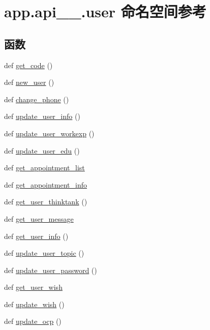 \hypertarget{namespaceapp_1_1api__1__0_1_1user}{}\section{app.\+api\+\_\+\_.\+user 命名空间参考}
\label{namespaceapp_1_1api__1__0_1_1user}
\subsection*{函数}
\begin{DoxyCompactItemize}
\item 
def \hyperlink{namespaceapp_1_1api__1__0_1_1user_aaa1dafab3a77326e0392cf339082e647}{get\+\_\+code} ()
\item 
def \hyperlink{namespaceapp_1_1api__1__0_1_1user_a55691ec00cfa22b8722440ac1c0e5488}{new\+\_\+user} ()
\item 
def \hyperlink{namespaceapp_1_1api__1__0_1_1user_a3decbd5fa1b9c12c3c07f4fd24c9334d}{change\+\_\+phone} ()
\item 
def \hyperlink{namespaceapp_1_1api__1__0_1_1user_a112fe5de3606f23f630ad74b003c3793}{update\+\_\+user\+\_\+info} ()
\item 
def \hyperlink{namespaceapp_1_1api__1__0_1_1user_a0bfdfa2ffc75a64ccceb916fecf3ca4e}{update\+\_\+user\+\_\+workexp} ()
\item 
def \hyperlink{namespaceapp_1_1api__1__0_1_1user_a8717211160238bc1ebc8017125817a3b}{update\+\_\+user\+\_\+edu} ()
\item 
def \hyperlink{namespaceapp_1_1api__1__0_1_1user_ac5e8e848c1b276331fd4973c7cceebc0}{get\+\_\+appointment\+\_\+list}
\item 
def \hyperlink{namespaceapp_1_1api__1__0_1_1user_a612d69aae95b49b644832971825b8c0b}{get\+\_\+appointment\+\_\+info}
\item 
def \hyperlink{namespaceapp_1_1api__1__0_1_1user_a7c088bb5f7150ff7ea87f1ddea02ba5e}{get\+\_\+user\+\_\+thinktank} ()
\item 
def \hyperlink{namespaceapp_1_1api__1__0_1_1user_a5024fd93f333168232806a99ad6cbbd4}{get\+\_\+user\+\_\+message}
\item 
def \hyperlink{namespaceapp_1_1api__1__0_1_1user_aa9a18cd0a720a6b498b2bd35be03ea4e}{get\+\_\+user\+\_\+info} ()
\item 
def \hyperlink{namespaceapp_1_1api__1__0_1_1user_aba3f803f01094c46bab3a2537f5a0e1b}{update\+\_\+user\+\_\+topic} ()
\item 
def \hyperlink{namespaceapp_1_1api__1__0_1_1user_aeb3490c84ceb14d756200260e7c8b2fd}{update\+\_\+user\+\_\+password} ()
\item 
def \hyperlink{namespaceapp_1_1api__1__0_1_1user_a87d06d052af0b620ed79eb30b38dbff4}{get\+\_\+user\+\_\+wish}
\item 
def \hyperlink{namespaceapp_1_1api__1__0_1_1user_a7c93d9eed896ab2dcd9134e48eeb88af}{update\+\_\+wish} ()
\item 
def \hyperlink{namespaceapp_1_1api__1__0_1_1user_a59970954545af8670d30330ede81432d}{update\+\_\+ocp} ()
\end{DoxyCompactItemize}


